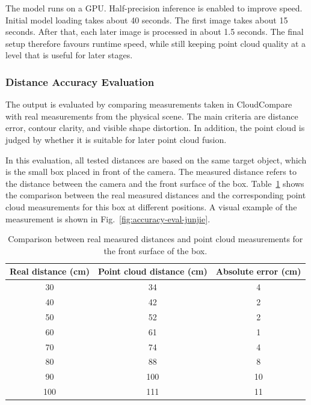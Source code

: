 \documentclass[12pt]{interim_report}
\begin{document}
The model runs on a GPU. Half-precision inference is enabled to improve speed. Initial model loading takes about 40 seconds. The first image takes about 15 seconds. After that, each later image is processed in about 1.5 seconds. The final setup therefore favours runtime speed, while still keeping point cloud quality at a level that is useful for later stages.

\subsubsection{Distance Accuracy Evaluation}
\label{subsubsec:distance-accuracy-evaluation-junjie-ouyang}

The output is evaluated by comparing measurements taken in CloudCompare with real measurements from the physical scene. The main criteria are distance error, contour clarity, and visible shape distortion. In addition, the point cloud is judged by whether it is suitable for later point cloud fusion.

In this evaluation, all tested distances are based on the same target object, which is the small box placed in front of the camera. The measured distance refers to the distance between the camera and the front surface of the box. Table~\ref{tab:distance-accuracy-junjie} shows the comparison between the real measured distances and the corresponding point cloud measurements for this box at different positions. A visual example of the measurement is shown in Fig.~\ref{fig:accuracy-eval-junjie}.

\begin{table}[htbp]
    \centering
    \caption{Comparison between real measured distances and point cloud measurements for the front surface of the box.}
    \label{tab:distance-accuracy-junjie}
    \begin{tabular}{|c|c|c|}
        \hline
        Real distance (cm) & Point cloud distance (cm) & Absolute error (cm) \\
        \hline
        30  & 34  & 4  \\
        40  & 42  & 2  \\
        50  & 52  & 2  \\
        60  & 61  & 1  \\
        70  & 74  & 4  \\
        80  & 88  & 8  \\
        90  & 100 & 10 \\
        100 & 111 & 11 \\
        \hline
    \end{tabular}
\end{table}
\end{document}
